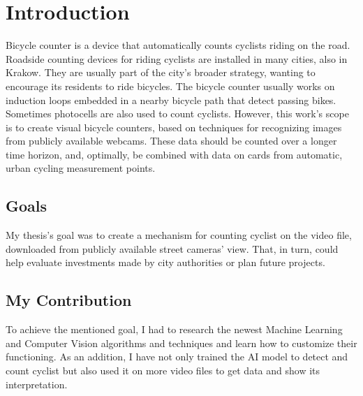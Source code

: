 \chapter{Introduction}
\label{cha:introduction}

Bicycle counter is a device that automatically counts cyclists riding on the road. Roadside counting devices for riding cyclists are installed in many cities, also in Krakow. They are usually part of the city's broader strategy, wanting to encourage its residents to ride bicycles. The bicycle counter usually works on induction loops embedded in a nearby bicycle path that detect passing bikes. Sometimes photocells are also used to count cyclists. However, this work's scope is to create visual bicycle counters, based on techniques for recognizing images from publicly available webcams. These data should be counted over a longer time horizon, and, optimally, be combined with data on cards from automatic, urban cycling measurement points.


\section{Goals}
\label{sec:goals}

My thesis's goal was to create a mechanism for counting cyclist on the video file, downloaded from publicly available street cameras' view. That, in turn, could help evaluate investments made by city authorities or plan future projects.



\section{My Contribution}
\label{sec:myContribution}

To achieve the mentioned goal, I had to research the newest Machine Learning and Computer Vision algorithms and techniques and learn how to customize their functioning. As an addition, I have not only trained the AI model to detect and count cyclist but also used it on more video files to get data and show its interpretation.



